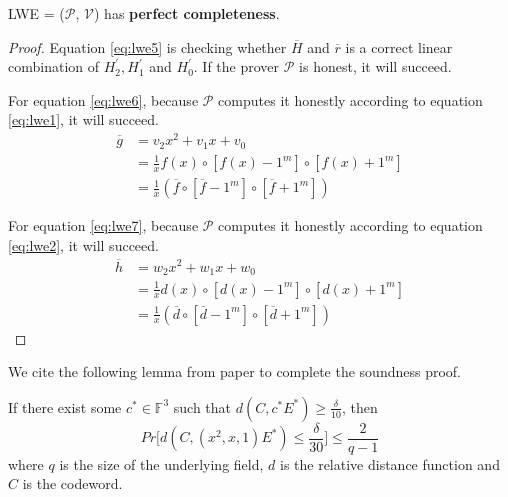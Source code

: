 \begin{lemma}
\label{lemma:lwepc}

LWE = ($\mathcal{P}$, $\mathcal{V}$) has \textbf{perfect completeness}.

\end{lemma}
\begin{proof}

Equation \ref{eq:lwe5} is checking whether $\overline{H}$ and $\overline{r}$ is a correct linear combination of $H_2^\prime, H_1^\prime$ and $H_0^\prime$. If the prover $\mathcal{P}$ is honest, it will succeed.


For equation \ref{eq:lwe6}, because $\mathcal{P}$ computes it honestly according to equation \ref{eq:lwe1}, it will succeed.
\begin{align*}
    \overline{g} 
    &= v_2x^2 + v_1x + v_0 \\
    &= \frac{1}{x} f(x) \circ [f(x) - 1^m] \circ [f(x) + 1^m] \\
    &= \frac{1}{x} (\overline{f} \circ [\overline{f} - 1^m] \circ [\overline{f} + 1^m]) 
\end{align*}

For equation \ref{eq:lwe7}, because $\mathcal{P}$ computes it honestly according to equation \ref{eq:lwe2}, it will succeed.
\begin{align*}
    \overline{h} 
    &= w_2x^2 + w_1x + w_0 \\
    &= \frac{1}{x} d(x) \circ [d(x) - 1^m] \circ [d(x) + 1^m] \\
    &= \frac{1}{x} (\overline{d} \circ [\overline{d} - 1^m] \circ [\overline{d} + 1^m]) 
\end{align*}

\end{proof}

We cite the following lemma from paper \cite{lwe} to complete the soundness proof.

\begin{lemma}
\label{lemma:lweseproof}

If there exist some $c^* \in \mathbb{F}^3$ such that $d(C, c^*E^*) \ge \frac{\delta}{10}$, then
$$
    Pr\biggl[ d(C, (x^2, x, 1)E^*) \le \frac{\delta}{30} \biggr] \le \frac{2}{q-1}
$$
where $q$ is the size of the underlying field, $d$ is the relative distance function and $C$ is the codeword.

\end{lemma}


